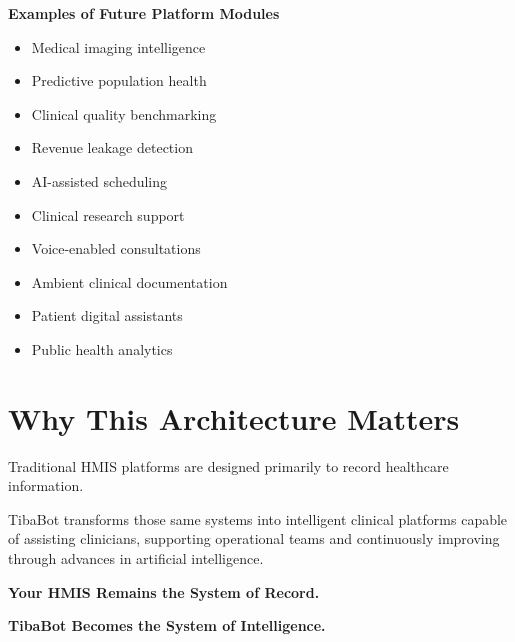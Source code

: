 \vspace{5mm}

\begin{infobox}

\textbf{Examples of Future Platform Modules}

\vspace{2mm}

\begin{itemize}

\item Medical imaging intelligence

\item Predictive population health

\item Clinical quality benchmarking

\item Revenue leakage detection

\item AI-assisted scheduling

\item Clinical research support

\item Voice-enabled consultations

\item Ambient clinical documentation

\item Patient digital assistants

\item Public health analytics

\end{itemize}

\end{infobox}


\section{Why This Architecture Matters}

Traditional HMIS platforms are designed primarily to record healthcare information.

TibaBot transforms those same systems into intelligent clinical platforms capable of assisting clinicians, supporting operational teams and continuously improving through advances in artificial intelligence.

\vspace{5mm}

\begin{callout}

\centering

\Large

\textbf{Your HMIS Remains the System of Record.}

\vspace{4mm}

\Large

\textbf{TibaBot Becomes the System of Intelligence.}

\end{callout}
